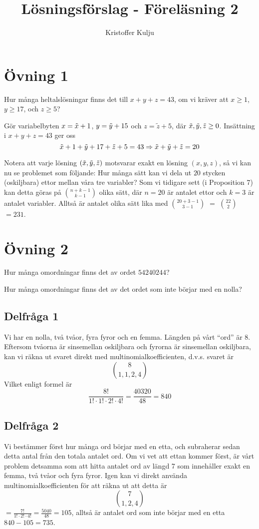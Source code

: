\documentclass{article}
\title{Lösningsförslag - Föreläsning 2}
\author{Kristoffer Kulju}
\begin{document}
\maketitle

\section*{Övning 1}
\begin{xca}
  Hur många heltalslösningar finns det till $x + y + z = 43$, om vi kräver att $x \geq 1$, $y \geq 17$, och $z \geq 5$?
\end{xca}

Gör variabelbyten $x=\Tilde{x} + 1$, $y = \Tilde{y} + 15$ och $z=\tilde{z}+5$, där $\Tilde{x}, \Tilde{y}, \Tilde{z}\geq 0$. Insättning i $x+y+z=43$ ger oss $$
\Tilde{x} + 1 + \Tilde{y} + 17 + \Tilde{z} + 5 = 43 \Rightarrow  \Tilde{x} +  \Tilde{y} +  \Tilde{z}= 20
$$

Notera att varje lösning $(\Tilde{x}, \Tilde{y}, \Tilde{z})$ motsvarar exakt en lösning $(x, y, z)$, så vi kan nu se problemet som följande: Hur många sätt kan vi dela ut $20$ stycken (oskiljbara) ettor mellan våra tre variabler? Som vi tidigare sett (i Proposition 7) kan detta göras på $n + k - 1 \choose k - 1$ olika sätt, där $n=20$ är antalet ettor och $k=3$ är antalet variabler. Alltså är antalet olika sätt lika med $20 + 3 - 1 \choose 3 - 1$ $=$ $22 \choose 2$ $=231$. 

\section*{Övning 2}
\begin{xca}
  Hur många omordningar finns det av ordet $54240244$?

  Hur många omordningar finns det av det ordet som inte börjar med en nolla?
\end{xca}

\subsection*{Delfråga 1}
Vi har en nolla, två tvåor, fyra fyror och en femma. Längden på vårt ``ord'' är 8. Eftersom tvåorna är sinsemellan oskiljbara och fyrorna är sinsemellan oskiljbara, kan vi räkna ut svaret direkt med multinomialkoefficienten, d.v.s. svaret är $$
8 \choose 1, 1, 2, 4 
$$
Vilket enligt formel är $$
\frac{8!}{1!\cdot1!\cdot2!\cdot4!} = \frac{40320}{48}=840
$$
\subsection*{Delfråga 2}
Vi bestämmer först hur många ord börjar med en etta, och subraherar sedan detta antal från den totala antalet ord. Om vi vet att ettan kommer först, är vårt problem detsamma som att hitta antalet ord av längd 7 som innehåller exakt en femma, två tvåor och fyra fyror. Igen kan vi direkt använda multinomialkoefficienten för att räkna ut att detta är $$
7 \choose 1, 2, 4
$$
$=\frac{7!}{1!\cdot 2!\cdot 4!}=\frac{5040}{48}=105$, alltså är antalet ord som inte börjar med en etta $840-105=735$. 
\end{document}
